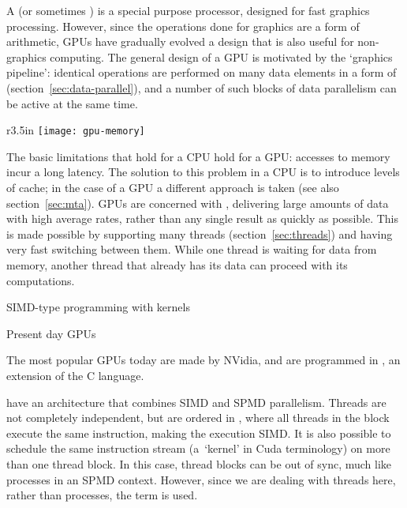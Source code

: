 
A  (or sometimes ) is a special purpose processor,
designed for fast graphics processing. However, since the operations
done for graphics are a form of arithmetic, \acp{GPU} have gradually
evolved a design that is also useful for non-graphics computing.
The general design of a \ac{GPU} is motivated by the `graphics
pipeline': identical
operations are performed on many data elements
in a form of 
(section~\ref{sec:data-parallel}),
and a number of such
blocks of data parallelism can be active at the same time.

\begin{wrapfigure}{r}{3.5in}
\texttt{[image: gpu-memory]}
\caption{Memory structure of a GPU.}
\label{fig:gpu-memory}
\end{wrapfigure}
%
The basic limitations that hold for a CPU hold for a \ac{GPU}:
accesses to memory incur a long latency. The solution to this problem
in a CPU is to introduce levels of cache; in the case of a \ac{GPU} a
different approach is taken (see also
section~\ref{sec:mta}). \acp{GPU} are concerned with
, delivering large amounts of data
with high average rates, rather than any single result as quickly as
possible. This is made possible by supporting many threads
(section~\ref{sec:threads}) and having very fast switching between
them. While one thread is waiting for data from memory, another thread
that already has its data can proceed with its computations.

 {SIMD-type programming with kernels}
\label{sec:gpu-kernel}

Present day \acp{GPU}
\begin{footnoteenv}
{The most popular GPUs today are made by
  NVidia, and are programmed in , an extension of the
  C language.}
  \end{footnoteenv}
have an architecture that combines \ac{SIMD}
and \ac{SPMD} parallelism. Threads are not completely independent, but
are ordered in , where all threads in the
block execute the same instruction, making the execution \ac{SIMD}. It
is also possible to schedule the same instruction stream
(a~`kernel' in Cuda terminology) on more than one
thread block. In this case, thread blocks can be out of sync, much
like processes in an \ac{SPMD} context. However, since we are dealing
with threads here, rather than processes, the term  is used.


